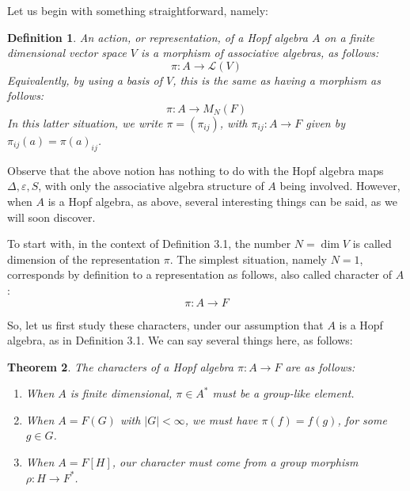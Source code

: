 \documentclass[12pt]{amsbook}
\newtheorem{theorem}{Theorem}[chapter]
\newtheorem{definition}[theorem]{Definition}
\begin{document}
\bigskip

Let us begin with something straightforward, namely:


\begin{definition}
An action, or representation, of a Hopf algebra $A$ on a finite dimensional vector space $V$ is a morphism of associative algebras, as follows:
$$\pi:A\to\mathcal L(V)$$
Equivalently, by using a basis of $V$, this is the same as having a morphism as follows:
$$\pi:A\to M_N(F)$$
In this latter situation, we write $\pi=(\pi_{ij})$, with $\pi_{ij}:A\to F$ given by $\pi_{ij}(a)=\pi(a)_{ij}$.
\end{definition}

Observe that the above notion has nothing to do with the Hopf algebra maps $\Delta,\varepsilon,S$, with only the associative algebra structure of $A$ being involved. However, when $A$ is a Hopf algebra, as above, several interesting things can be said, as we will soon discover. 

\bigskip

To start with, in the context of Definition 3.1, the number $N=\dim V$ is called dimension of the representation $\pi$. The simplest situation, namely $N=1$, corresponds by definition to a representation as follows, also called character of $A$:
$$\pi:A\to F$$

So, let us first study these characters, under our assumption that $A$ is a Hopf algebra, as in Definition 3.1. We can say several things here, as follows:


\begin{theorem}
The characters of a Hopf algebra $\pi:A\to F$ are as follows:
\begin{enumerate}
\item When $A$ is finite dimensional, $\pi\in A^*$ must be a group-like element.

\item When $A=F(G)$ with $|G|<\infty$, we must have $\pi(f)=f(g)$, for some $g\in G$.

\item When $A=F[H]$, our character must come from a group morphism $\rho:H\to F^*$.
\end{enumerate}
\end{theorem}
\end{document}
